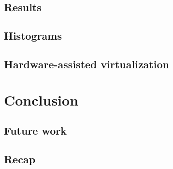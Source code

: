\documentclass{beamer} %
\begin{document}
        \subsection{Results}
        

        \subsection{Histograms}
	

        \subsection{Hardware-assisted virtualization}
        

        \section{Conclusion}

        \subsection{Future work}
	

        \subsection{Recap}
	

        
\end{document}
